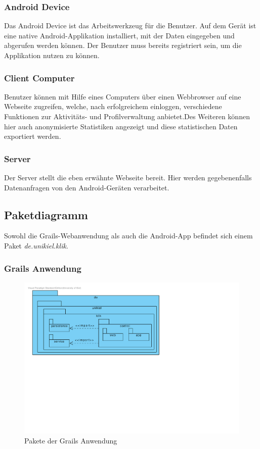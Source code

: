 \subsubsection{Android Device}
Das Android Device ist das Arbeitswerkzeug für die Benutzer. Auf dem
Gerät ist eine native Android-Applikation installiert, mit der Daten
eingegeben und abgerufen werden können. Der Benutzer muss bereits
registriert sein, um die Applikation nutzen zu können.

\subsubsection{Client Computer}
Benutzer können mit Hilfe eines Computers über einen Webbrowser auf eine Webseite zugreifen, welche, nach erfolgreichem einloggen, verschiedene Funktionen zur Aktivitäts- und Profilverwaltung anbietet.Des Weiteren können hier auch anonymisierte Statistiken angezeigt und diese statistischen Daten exportiert werden.

\subsubsection{Server}
Der Server stellt die eben erwähnte Webseite bereit. Hier werden gegebenenfalls Datenanfragen von den Android-Geräten verarbeitet.

\subsection{Paketdiagramm}
Sowohl die Grails-Webanwendung als auch die Android-App befindet sich einem Paket \emph{de.unikiel.klik}.

\subsubsection{Grails Anwendung}

\begin{figure}[H]
  \centering
  \includegraphics[width=\textwidth, trim=1cm 10cm 11cm 1cm, clip]{gfx/package_diagram}
  \caption{Pakete der Grails Anwendung}
\end{figure}

